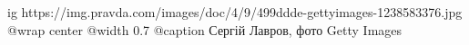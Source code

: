  
 
 
 
 

\ifcmt
  ig https://img.pravda.com/images/doc/4/9/499ddde-gettyimages-1238583376.jpg
	@wrap center
	@width 0.7
  @caption Сергій Лавров, фото Getty Images
\fi
